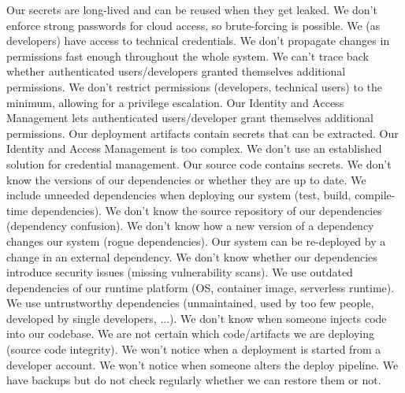 %

% 
 {Our secrets are long-lived and can be reused when they get leaked.}
 {We don't enforce strong passwords for cloud access, so brute-forcing is possible.}
 {We (as developers) have access to technical credentials.}
 {We don't propagate changes in permissions fast enough throughout the whole system.}
 {We can't trace back whether authenticated users/developers granted themselves additional permissions.}
 {We don't restrict permissions (developers, technical users) to the minimum, allowing for a privilege escalation.}
 {Our Identity and Access Management lets authenticated users/developer grant themselves additional permissions.}
 {Our deployment artifacts contain secrets that can be extracted.}
 {Our Identity and Access Management is too complex.}
 {We don't use an established solution for credential management.}
 {Our source code contains secrets.}
%
 {We don't know the versions of our dependencies or whether they are up to date.}
 {We include unneeded dependencies when deploying our system (test, build, compile-time dependencies).}
 {We don't know the source repository of our dependencies (dependency confusion).}
 {We don't know how a new version of a dependency changes our system (rogue dependencies).}
 {Our system can be re-deployed by a change in an external dependency.}
 {We don't know whether our dependencies introduce security issues (missing vulnerability scans).}
 {We use outdated dependencies of our runtime platform (OS, container image, serverless runtime).}
 {We use untrustworthy dependencies (unmaintained, used by too few people, developed by single developers, ...).}
 {We don't know when someone injects code into our codebase.}
 {We are not certain which code/artifacts we are deploying (source code integrity).}
 {We won't notice when a deployment is started from a developer account.}
 {We won't notice when someone alters the deploy pipeline.}
%
 {We have backups but do not check regularly whether we can restore them or not.}
